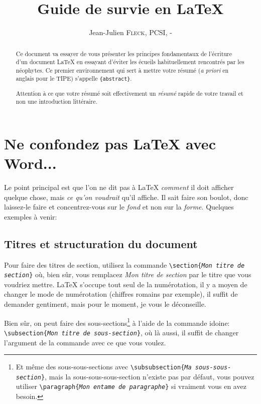 \documentclass[12pt,a4paper]{article}
\title{Guide de survie en \LaTeX{}}
\author{Jean-Julien \textsc{Fleck}, PCSI\oldstylenums{1}, \oldstylenums{2016}-\oldstylenums{2017}}
\newcommand{\ofg}[1]{\og{}#1\fg{}}
\newcommand{\env}[1]{\texttt{\{#1\}}}
\newcommand{\cmd}[1]{\texttt{\textbackslash#1}}
\newcommand{\cmdone}[2]{\cmd{#1\{\emph{#2}\}}}
\begin{document}
\maketitle


\begin{abstract}

    
    Ce document va essayer de vous présenter les principes fondamentaux de l'écriture d'un document \LaTeX{} en essayant d'éviter les écueils habituellement rencontrés par les néophytes. Ce premier environnement qui sert à mettre votre résumé (\emph{a priori} en anglais pour le TIPE) s'appelle \env{abstract}.
    
    Attention à ce que votre résumé soit effectivement un \emph{résumé} rapide de votre travail et non une introduction littéraire.
    
\end{abstract}

\section{Ne confondez pas \LaTeX{} avec Word...}

Le point principal est que l'on ne dit pas à \LaTeX{} \emph{comment} il doit afficher quelque chose, mais \emph{ce qu'on voudrait} qu'il affiche. Il sait faire son boulot, donc laissez-le faire et concentrez-vous sur le \emph{fond} et non sur la \emph{forme}. Quelques exemples à venir:


\subsection{Titres et structuration du document}

Pour faire des titres de section, utilisez la commande \cmdone{section}{Mon titre de section} où, bien sûr, vous remplacez \ofg{\emph{Mon titre de section}} par le titre que vous voudriez mettre. \LaTeX{} s'occupe tout seul de la numérotation, il y a moyen de changer le mode de numérotation (chiffres romains par exemple), il suffit de demander gentiment, mais pour le moment, je vous le déconseille.

Bien sûr, on peut faire des sous-sections\footnote{Et même des sous-sous-sections avec \cmdone{subsubsection}{Ma sous-sous-section}, mais la sous-sous-sous-section n'existe pas par défaut, vous pouvez utiliser \cmdone{paragraph}{Mon entame de paragraphe} si vraiment vous en avez besoin.} à l'aide de la commande idoine: \cmdone{subsection}{Mon titre de sous-section}, où là aussi, il suffit de changer l'argument de la commande avec ce que vous voulez.
\end{document}
